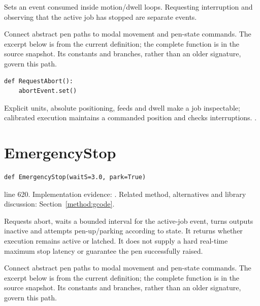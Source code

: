 Sets an event consumed inside motion/dwell loops. Requesting interruption and observing that the active job has stopped are separate events.


Connect abstract pen paths to modal movement and pen-state commands. The excerpt below is from the current definition; the complete function is in the source snapshot. Its constants and branches, rather than an older signature, govern this path.


\begin{lstlisting}[style=plain]
def RequestAbort():
    abortEvent.set()
\end{lstlisting}
Explicit units, absolute positioning, feeds and dwell make a job inspectable; calibrated execution maintains a commanded position and checks interruptions. \cite{code2026,linuxcnc}.


\section{EmergencyStop}\label{fn:reproduce:EmergencyStop}
\begin{lstlisting}[style=sig]
def EmergencyStop(waitS=3.0, park=True)
\end{lstlisting}
 line 620. Implementation evidence: \cite{code2026}. Related method, alternatives and library discussion: Section~\ref{method:gcode}.


Requests abort, waits a bounded interval for the active-job event, turns outputs inactive and attempts pen-up/parking according to state. It returns whether execution remains active or latched. It does not supply a hard real-time maximum stop latency or guarantee the pen successfully raised.


Connect abstract pen paths to modal movement and pen-state commands. The excerpt below is from the current definition; the complete function is in the source snapshot. Its constants and branches, rather than an older signature, govern this path.


